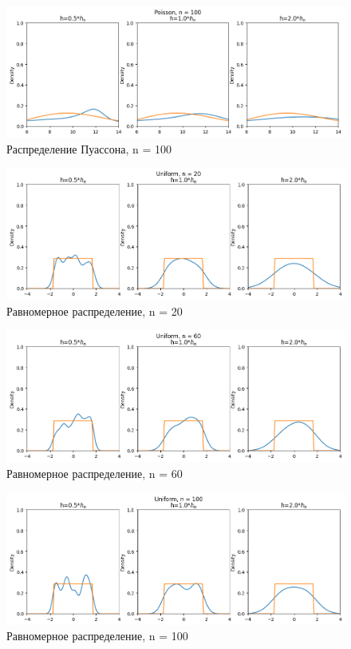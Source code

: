 \begin{figure}[H]
	\includegraphics[width=\textwidth]{tasks/4/res/43.png}
	\caption{Распределение Пуассона, n = 100} 
\end{figure}
	
\begin{figure}[H]
	\includegraphics[width=\textwidth]{tasks/4/res/51.png}
	\caption{Равномерное распределение, n = 20} 
\end{figure}

\begin{figure}[H]
	\includegraphics[width=\textwidth]{tasks/4/res/52.png}
	\caption{Равномерное распределение, n = 60} 
\end{figure}

\begin{figure}[H]
	\includegraphics[width=\textwidth]{tasks/4/res/53.png}
	\caption{Равномерное распределение, n = 100} 
\end{figure}
